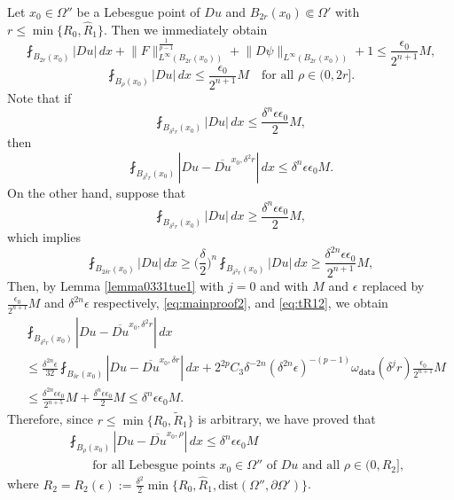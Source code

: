 \documentclass[reqno]{amsart}
\numberwithin{equation}{section}
\theoremstyle{plain}
\theoremstyle{definition}
\theoremstyle{remark}
\providecommand{\abs}[1]{\lvert#1\rvert}
\providecommand{\norm}[1]{\lVert#1\rVert}
\begin{document}
Let $x_0\in \Omega''$ be a Lebesgue point of $Du$ and $B_{2r}(x_0)\Subset\Omega'$ with $r\le \min\{R_0,\hat R_1\}$. Then we immediately obtain
\begin{equation}\label{eq:mainproof1}
\fint_{B_{2r}(x_0)}\abs{Du} \, dx +  \norm{F}_{L^\infty(B_{2r}(x_0))}
^{\frac{1}{p-1}}+\norm{D\psi}_{L^\infty(B_{2r}(x_0))} +1\leq \frac{\epsilon_0}{2^{n+1}} M,
\end{equation}
\begin{equation}\label{eq:mainproof2}
\fint_{B_{\rho}(x_0)}\abs{Du} \, dx \le \frac{\epsilon_0}{2^{n+1}} M 
\quad \text{for all } \rho\in (0, 2r].
\end{equation}
Note that if 
\[
\fint_{B_{\delta^{2}r}(x_0)} |Du|\,dx \le   \frac{\delta^n\epsilon\epsilon_0}{2} M,
\]
then
\[
\fint_{B_{\delta^{2}r}(x_0)} |Du-\overline{Du}^{x_0,\delta^2r}|\,dx \le  \delta^n \epsilon\epsilon_0 M.
\]
On the other hand, suppose that
\[
\fint_{B_{\delta^{2}r}(x_0)} |Du|\,dx \ge    \frac{\delta^n\epsilon\epsilon_0}{2} M,
\]
which implies
\[
\fint_{B_{2\delta r}(x_0)} |Du|\,dx  \ge \bigg(\frac{\delta}{2}\bigg)^n \fint_{B_{\delta^2 r}(x_0)} |Du|\,dx \ge  \frac{\delta^{2n}  \epsilon \epsilon_0  }{2^{n+1}} M,
\]
Then, by Lemma \ref{lemma0331tue1} with $j=0$ and with $M$ and $\epsilon$ replaced by $\frac{\epsilon_0}{2^{n+1}} M$ and $\delta^{2n}  \epsilon$ respectively, \eqref{eq:mainproof2}, and \eqref{eq:tR12},  we obtain
\[\begin{split}
&\fint_{B_{\delta^2 r}(x_0)} |Du-\overline{Du}^{x_0,\delta^2 r}|\,dx \\
& \leq \frac{\delta^{2n} \epsilon}{32} \fint_{B_{\delta r}(x_0)} |Du-\overline{Du}^{x_0,\delta r}|\,dx +2^{2p}C_3\delta^{-2n} ( \delta^{2n} \epsilon)^{-(p-1)}\omega_{\mathsf{data}}(\delta^j r)   \frac{\epsilon_0}{2^{n+1}} M \\
& \leq \frac{ \delta^{2n} \epsilon \epsilon_0}{2^{n+5}} M+ \frac{ \delta^{n} \epsilon \epsilon_0}{2}  M \le   \delta^{n} \epsilon \epsilon_0  M.
\end{split}
\]
Therefore, since $r\le \min\{R_0,\tilde R_1\}$ is arbitrary, we have proved that
\begin{equation}\label{eq:mainproof3}\begin{split}
&\fint_{B_\rho(x_0)}|Du-\overline{Du}^{x_0,\rho}|\, dx  \le \delta^{n} \epsilon \epsilon_0  M \\
&\qquad \text{for all Lebesgue points $x_0\in \Omega''$ of $Du$ and all $\rho\in(0, R_2]$,}
\end{split}\end{equation}
where $R_2=R_2(\epsilon):= \frac{\delta^2}{2} \min\{R_0,\hat R_1, \mathrm{dist}(\Omega'',\partial \Omega')\}$.
 
\end{document}
